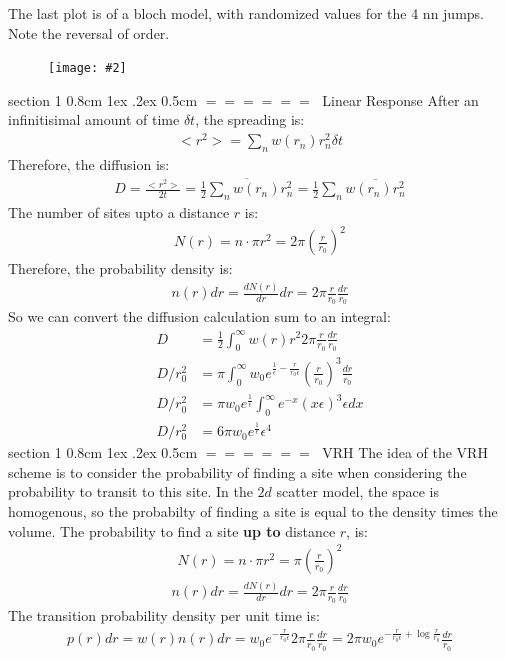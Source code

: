 \documentclass[onecolumn,fleqn,notitlepage,secnumarabic]{revtex4}
\makeatletter
\def\section{%
  \@startsection
    {section}%
    {1}%
    {\z@}%
    {0.8cm \@plus1ex \@minus .2ex}%
    {0.5cm}%
    {\Large\bf $=\!=\!=\!=\!=\!=\;$}%
}%
\newcommand{\dontincludegraphics}[2][]{\texttt{[image: \#2]}}
\makeatother
\begin{document}

The last plot is of a bloch model, with randomized values for the 4 nn jumps. Note the reversal of order.
\begin{figure}[H]
\dontincludegraphics[clip,width=0.9\hsize]{bloch_2d_4nn_rand_log_eig}
\end{figure}

\section{Linear Response}
After an infinitisimal amount of time $\delta t$, the spreading is:
\begin{align}   <r^2> = \sum_n w(r_n) r_n^2 \delta t \end{align}  
Therefore, the diffusion is:
\begin{align}   D = \frac{<r^2>}{2t} =  \overline{\frac{1}{2} \sum_n w(r_n) r_n^2} = \frac{1}{2}\sum_n \overline{w(r_n)r_n^2}\end{align}  
The number of sites upto a distance $r$ is:
\begin{align}   N(r) = n\cdot \pi r^2 = 2\pi\left(\frac{r}{r_0}\right)^2\end{align}  
Therefore, the probability density is:
\begin{align}   n(r)dr = \frac{dN(r)}{dr}dr = 2\pi \frac{r}{r_0}\frac{dr}{r_0}\end{align}  
So we can convert the diffusion calculation sum to an integral:
\begin{align} 
  D &= \frac{1}{2}\int_0^\infty w(r) r^2 2\pi \frac{r}{r_0} \frac{dr}{r_0} \\
  D/r_0^2 &= \pi \int_0^\infty w_0 e^{\frac{1}{\epsilon}-\frac{r}{r_0\epsilon}} \left(\frac{r}{r_0}\right)^3 \frac{dr}{r_0} \\
  D/r_0^2 &= \pi w_0 e^{\frac{1}{\epsilon}}\int_0^\infty  e^{-x} (x\epsilon)^3 \epsilon dx\\
  D/r_0^2 &= 6\pi w_0 e^{\frac{1}{\epsilon}}\epsilon^4 
\end{align}
\section{VRH}
The idea of the VRH scheme is to consider the probability of finding a site when considering the probability to transit to this site. In the $2d$ scatter model, the space is homogenous, so the probabilty of finding a site is equal to the density times the volume. The probability to find a site {\bf up to} distance $r$, is:
\begin{align}   N(r) = n\cdot \pi r^2 = \pi \left(\frac{r}{r_0}\right)^2\end{align}  
\begin{align}   n(r)dr = \frac{dN(r)}{dr}dr = 2\pi \frac{r}{r_0}\frac{dr}{r_0}\end{align}  
The transition probability density per unit time is:
\begin{align}  p(r)dr = w(r)n(r)dr = w_0 e^{-\frac{r}{r_0\epsilon}}2\pi \frac{r}{r_0}\frac{dr}{r_0}=2\pi w_0 e^{-\frac{r}{r_0\epsilon} + \log\frac{r}{r_0}}\frac{dr}{r_0}
\end{align}  
\end{document}

